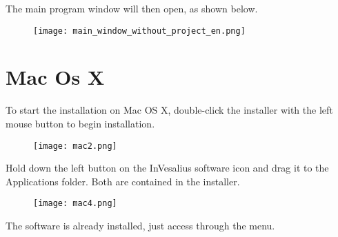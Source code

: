 \hspace{.2cm}

The main program window will then open, as shown below.

\begin{figure}[!htb]
\centering
\texttt{[image: main\_window\_without\_project\_en.png]}
\end{figure}

\section{Mac Os X}

To start the installation on Mac OS X, double-click the installer with the left mouse button to begin installation.

\begin{figure}[!htb]
\centering
\texttt{[image: mac2.png]}
\end{figure}

Hold down the left button on the InVesalius software icon and drag it to the Applications folder. Both are contained in the installer.

\begin{figure}[!htb]
\centering
\texttt{[image: mac4.png]}
\end{figure}

The software is already installed, just access through the menu.